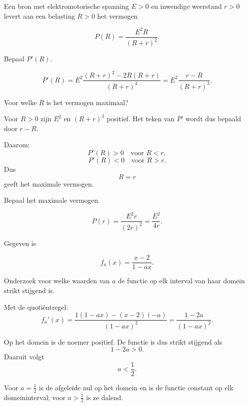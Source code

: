 \documentclass{ximera}
\begin{document}
\begin{oefening}{\oefU\ESS}
Een bron met elektromotorische spanning \(E>0\) en inwendige weerstand
\(r>0\) levert aan een belasting \(R>0\) het vermogen

\[
P(R)=\frac{E^2R}{(R+r)^2}.
\]

\begin{question}
Bepaal \(P'(R)\).

\begin{oplossing}
\[
P'(R)
=
E^2\frac{(R+r)^2-2R(R+r)}{(R+r)^4}
=
E^2\frac{r-R}{(R+r)^3}.
\]
\end{oplossing}
\end{question}

\begin{question}
Voor welke \(R\) is het vermogen maximaal?

\begin{oplossing}
Voor \(R>0\) zijn \(E^2\) en \((R+r)^3\) positief. Het teken van \(P'\)
wordt dus bepaald door \(r-R\).

Daarom:
\[
P'(R)>0\quad\text{voor }R<r,
\]
\[
P'(R)<0\quad\text{voor }R>r.
\]
Dus
\[
\boxed{R=r}
\]
geeft het maximale vermogen.
\end{oplossing}
\end{question}

\begin{question}
Bepaal het maximale vermogen.

\begin{oplossing}
\[
P(r)
=
\frac{E^2r}{(2r)^2}
=
\boxed{\frac{E^2}{4r}}.
\]
\end{oplossing}
\end{question}
\end{oefening}



\begin{oefening}[Parameteronderzoek]{\oefG}
Gegeven is

\[
f_a(x)=\frac{x-2}{1-ax}.
\]

Onderzoek voor welke waarden van \(a\) de functie op elk interval van
haar domein strikt stijgend is.

\begin{oplossing}
Met de quotiëntregel:
\[
f_a'(x)
=
\frac{1(1-ax)-(x-2)(-a)}{(1-ax)^2}
=
\frac{1-2a}{(1-ax)^2}.
\]

Op het domein is de noemer positief. De functie is dus strikt stijgend
als
\[
1-2a>0.
\]
Daaruit volgt
\[
\boxed{a<\frac12}.
\]

Voor \(a=\frac12\) is de afgeleide nul op het domein en is de functie
constant op elk domeininterval; voor \(a>\frac12\) is ze dalend.
\end{oplossing}
\end{oefening}
\end{document}
